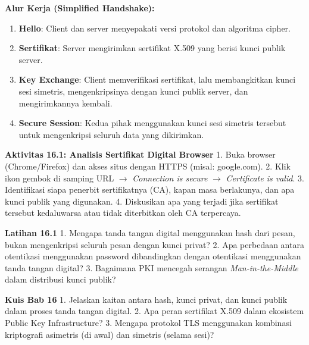 \documentclass[../main.tex]{subfiles}
\begin{document}
\textbf{Alur Kerja (Simplified Handshake):}
\begin{enumerate}
    \item \textbf{Hello}: Client dan server menyepakati versi protokol dan algoritma cipher.
    \item \textbf{Sertifikat}: Server mengirimkan sertifikat X.509 yang berisi kunci publik server.
    \item \textbf{Key Exchange}: Client memverifikasi sertifikat, lalu membangkitkan kunci sesi simetris, mengenkripsinya dengan kunci publik server, dan mengirimkannya kembali.
    \item \textbf{Secure Session}: Kedua pihak menggunakan kunci sesi simetris tersebut untuk mengenkripsi seluruh data yang dikirimkan.
\end{enumerate}

\begin{obeactivity}
\textbf{Aktivitas 16.1: Analisis Sertifikat Digital Browser}
1. Buka browser (Chrome/Firefox) dan akses situs dengan HTTPS (misal: google.com).
2. Klik ikon gembok di samping URL $\rightarrow$ \textit{Connection is secure} $\rightarrow$ \textit{Certificate is valid}.
3. Identifikasi siapa penerbit sertifikatnya (CA), kapan masa berlakunya, dan apa kunci publik yang digunakan.
4. Diskusikan apa yang terjadi jika sertifikat tersebut kedaluwarsa atau tidak diterbitkan oleh CA terpercaya.
\end{obeactivity}

\begin{obereflection}
\textbf{Latihan 16.1}
1. Mengapa tanda tangan digital menggunakan hash dari pesan, bukan mengenkripsi seluruh pesan dengan kunci privat?
2. Apa perbedaan antara otentikasi menggunakan password dibandingkan dengan otentikasi menggunakan tanda tangan digital?
3. Bagaimana PKI mencegah serangan \textit{Man-in-the-Middle} dalam distribusi kunci publik?
\end{obereflection}

\begin{obeassessment}
\textbf{Kuis Bab 16}
1. Jelaskan kaitan antara hash, kunci privat, dan kunci publik dalam proses tanda tangan digital.
2. Apa peran sertifikat X.509 dalam ekosistem Public Key Infrastructure?
3. Mengapa protokol TLS menggunakan kombinasi kriptografi asimetris (di awal) dan simetris (selama sesi)?
\end{obeassessment}
\end{document}
